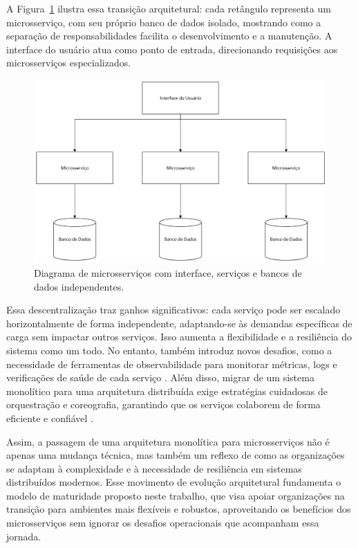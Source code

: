A Figura~\ref{fig:diagrama-microsservicos} ilustra essa transição arquitetural: cada retângulo representa um microsserviço, com seu próprio banco de dados isolado, mostrando como a separação de responsabilidades facilita o desenvolvimento e a manutenção. A interface do usuário atua como ponto de entrada, direcionando requisições aos microsserviços especializados.

\begin{figure}[H]
\centering
\includegraphics[width=0.7\linewidth]{imagens/microsservico-diagrama.png}
\caption{Diagrama de microsserviços com interface, serviços e bancos de dados independentes.}
\label{fig:diagrama-microsservicos}
\end{figure}

Essa descentralização traz ganhos significativos: cada serviço pode ser escalado horizontalmente de forma independente, adaptando-se às demandas específicas de carga sem impactar outros serviços. Isso aumenta a flexibilidade e a resiliência do sistema como um todo. No entanto, também introduz novos desafios, como a necessidade de ferramentas de observabilidade para monitorar métricas, logs e verificações de saúde de cada serviço \citep{Newman:15:MS}. Além disso, migrar de um sistema monolítico para uma arquitetura distribuída exige estratégias cuidadosas de orquestração e coreografia, garantindo que os serviços colaborem de forma eficiente e confiável \citep{baskarada2018}.

Assim, a passagem de uma arquitetura monolítica para microsserviços não é apenas uma mudança técnica, mas também um reflexo de como as organizações se adaptam à complexidade e à necessidade de resiliência em sistemas distribuídos modernos. Esse movimento de evolução arquitetural fundamenta o modelo de maturidade proposto neste trabalho, que visa apoiar organizações na transição para ambientes mais flexíveis e robustos, aproveitando os benefícios dos microsserviços sem ignorar os desafios operacionais que acompanham essa jornada.

